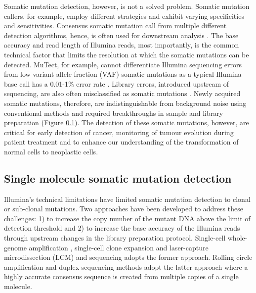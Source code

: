 Somatic mutation detection, however, is not a solved problem. Somatic mutation callers, for example, employ different strategies and exhibit varying specificities and sensitivities. Consensus somatic mutation call from multiple different detection algorithms, hence, is often used for downstream analysis \cite{Bailey2020-ou}. The base accuracy and read length of Illumina reads, most importantly, is the common technical factor that limits the resolution at which the somatic mutations can be detected. MuTect, for example, cannot differentiate Illumina sequencing errors from low variant allele fraction (VAF) somatic mutations as a typical Illumina base call has a 0.01-1\% error rate \cite{Cibulskis2013-gw}. Library errors, introduced upstream of sequencing, are also often misclassified as somatic mutations \cite{Costello2013-cz, Chen2017-ba, Abascal2021-pk}. Newly acquired somatic mutations, therefore, are indistinguishable from background noise using conventional methods and required breakthroughs in sample and library preparation (Figure \ref{}). The detection of these somatic mutations, however, are critical for early detection of cancer, monitoring of tumour evolution during patient treatment and to enhance our understanding of the transformation of normal cells to neoplastic cells. 

\subsection{Single molecule somatic mutation detection}

Illumina’s technical limitations have limited somatic mutation detection to clonal or sub-clonal mutations. Two approaches have been developed to address these challenges: 1) to increase the copy number of the mutant DNA above the limit of detection threshold and 2) to increase the base accuracy of the Illumina reads through upstream changes in the library preparation protocol. Single-cell whole-genome amplification \cite{Lodato2018-hh}, single-cell clone expansion \cite{Lee-Six2018-qe} and laser-capture microdissection (LCM) \cite{Ellis2021-it} and sequencing adopts the former approach. Rolling circle amplification \cite{Lizardi1998-qh, Dahl2004-tm} and duplex sequencing methods \cite{Schmitt2012-yr, Abascal2021-pk, Hoang2016-jx} adopt the latter approach where a highly accurate consensus sequence is created from multiple copies of a single molecule. 

